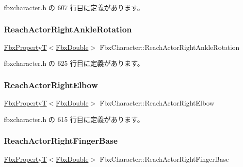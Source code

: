  fbxcharacter.\+h の 607 行目に定義があります。

\mbox{\label{class_fbx_character_aafb537afb1c75aac614feea168fbf5bb}} 
\subsubsection{\texorpdfstring{Reach\+Actor\+Right\+Ankle\+Rotation}{ReachActorRightAnkleRotation}}
{\footnotesize\ttfamily \hyperlink{class_fbx_property_t}{Fbx\+PropertyT}$<$\hyperlink{fbxtypes_8h_a171e72a1c46fc15c1a6c9c31948c1c5b}{Fbx\+Double}$>$ Fbx\+Character\+::\+Reach\+Actor\+Right\+Ankle\+Rotation}



 fbxcharacter.\+h の 625 行目に定義があります。

\mbox{\label{class_fbx_character_aef8163beb5ed38d2f8124f4b9de948c5}} 
\subsubsection{\texorpdfstring{Reach\+Actor\+Right\+Elbow}{ReachActorRightElbow}}
{\footnotesize\ttfamily \hyperlink{class_fbx_property_t}{Fbx\+PropertyT}$<$\hyperlink{fbxtypes_8h_a171e72a1c46fc15c1a6c9c31948c1c5b}{Fbx\+Double}$>$ Fbx\+Character\+::\+Reach\+Actor\+Right\+Elbow}



 fbxcharacter.\+h の 615 行目に定義があります。

\mbox{\label{class_fbx_character_af3fcc1f9148d9612c3b3a2b8bcb60a3d}} 
\subsubsection{\texorpdfstring{Reach\+Actor\+Right\+Finger\+Base}{ReachActorRightFingerBase}}
{\footnotesize\ttfamily \hyperlink{class_fbx_property_t}{Fbx\+PropertyT}$<$\hyperlink{fbxtypes_8h_a171e72a1c46fc15c1a6c9c31948c1c5b}{Fbx\+Double}$>$ Fbx\+Character\+::\+Reach\+Actor\+Right\+Finger\+Base}



